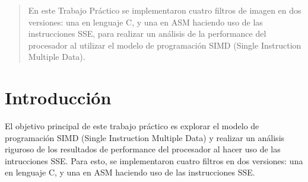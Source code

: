 \documentclass[a4paper]{article}
\begin{document}
\thispagestyle{empty}

\maketitle
\newpage

\thispagestyle{empty}
\vfill
\begin{abstract}
En este Trabajo Práctico se implementaron cuatro filtros de imagen en dos versiones: una en lenguaje C, y una en ASM haciendo uso de las instrucciones SSE, para realizar un análisis de la performance del procesador al utilizar el modelo de programación SIMD (Single Instruction Multiple Data). 

\end{abstract}

\thispagestyle{empty}
\vspace{3cm}
\tableofcontents
\newpage


\newpage

\section{Introducción}
El objetivo principal de este trabajo práctico es explorar el modelo de programación SIMD (Single Instruction Multiple Data) y realizar un análisis riguroso de los resultados de performance del procesador al hacer uso de las intrucciones SSE. Para esto, se implementaron cuatro filtros en dos versiones: una en lenguaje C, y una en ASM haciendo uso de las instrucciones SSE.
\end{document}
